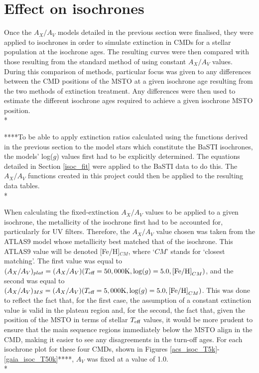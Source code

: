 \documentclass[12pt, a4paper]{report}
\begin{document}
\section{Effect on isochrones} \label{result_CMDs}
Once the $A_{X}/A_{V}$ models detailed in the previous section were finalised, they were applied to isochrones in order to simulate extinction in CMDs for a stellar population at the isochrone ages. The resulting curves were then compared with those resulting from the standard method of using constant $A_{X}/A_{V}$ values. During this comparison of methods, particular focus was given to any differences between the CMD positions of the MSTO at a given isochrone age resulting from the two methods of extinction treatment. Any differences were then used to estimate the different isochrone ages required to achieve a given isochrone MSTO position. \\*

****To be able to apply extinction ratios calculated using the functions derived in the previous section to the model stars which constitute the BaSTI isochrones, the models' log($g$) values first had to be explicitly determined. The equations detailed in Section \ref{isoc_fit} were applied to the BaSTI data to do this. The $A_{X}/A_{V}$ functions created in this project could then be applied to the resulting data tables. \\*

When calculating the fixed-extinction $A_{X}/A_{V}$ values to be applied to a given isochrone, the metallicity of the isochrone first had to be accounted for, particularly for UV filters. Therefore, the $A_{X}/A_{V}$ value chosen was taken from the ATLAS9 model whose metallicity best matched that of the isochrone. This ATLAS9 value will be denoted [Fe/H]$_{CM}$, where `$CM$' stands for `closest matching'. The first value was equal to $(A_{X}/A_{V})_{plat} = (A_{X}/A_{V})(T_{\textnormal{eff}} = 50,000\textnormal{K},\log(g) = 5.0,\textnormal{[Fe/H]}_{CM})$, and the second was equal to $(A_{X}/A_{V})_{MS} = (A_{X}/A_{V})(T_{\textnormal{eff}} = 5,000\textnormal{K},\log(g) = 5.0,\textnormal{[Fe/H]}_{CM})$. This was done to reflect the fact that, for the first case, the assumption of a constant extinction value is valid in the plateau region and, for the second, the fact that, given the position of the MSTO in terms of stellar $T_{\textnormal{eff}}$ values, it would be more prudent to ensure that the main sequence regions immediately below the MSTO align in the CMD, making it easier to see any disagreements in the turn-off ages. For each isochrone plot for these four CMDs, shown in Figures \ref{acs_isoc_T5k}-\ref{gaia_isoc_T50k}****, $A_{V}$ was fixed at a value of 1.0.\\*
\end{document}
